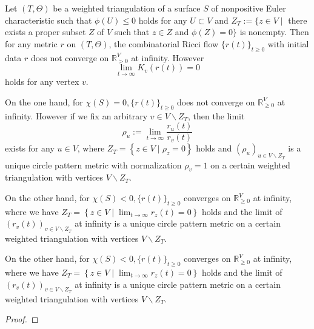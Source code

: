 \begin{theorem}\label{Asuka-Takatsu--theorem}
  Let $ (T, \Theta) $ be a weighted triangulation of a surface $ S $ of nonpositive Euler characteristic such that $ \phi(U) \leq 0 $ holds for any $ U \subset V $ and $ Z_{T}:=\{z \in V \mid $ there exists a proper subset $ Z $ of $ V $ such that $ z \in Z $ and $ \phi(Z)=0\} $ is nonempty. Then for any metric $ r $ on $ (T, \Theta) $, the combinatorial Ricci flow $ \{r(t)\}_{t \geq 0} $ with initial data $ r $ does not converge on $ \mathbb{R}_{>0}^{V} $ at infinity. However
  $$
  \lim _{t \rightarrow \infty} K_{v}(r(t))=0
  $$
  holds for any vertex $ v $.

  On the one hand, for $ \chi(S)=0,\{r(t)\}_{t \geq 0} $ does not converge on $ \mathbb{R}_{\geq 0}^{V} $ at infinity. However if we fix an arbitrary $ v \in V \backslash Z_{T} $, then the limit
  $$
  \rho_{u}:=\lim _{t \rightarrow \infty} \frac{r_{u}(t)}{r_{v}(t)}
  $$
  exists for any $ u \in V $, where $ Z_{T}=\left\{z \in V \mid \rho_{z}=0\right\} $ holds and $ \left(\rho_{u}\right)_{u \in V \backslash Z_{T}} $ is a unique circle pattern metric with normalization $ \rho_{v}=1 $ on a certain weighted triangulation with vertices $ V \backslash Z_{T} $.

  On the other hand, for $ \chi(S)<0,\{r(t)\}_{t \geq 0} $ converges on $ \mathbb{R}_{\geq 0}^{V} $ at infinity, where we have $ Z_{T}=\left\{z \in V \mid \lim _{t \rightarrow \infty} r_{z}(t)=0\right\} $ holds and the limit of $ \left(r_{v}(t)\right)_{v \in V \backslash Z_{T}} $ at infinity is a unique circle pattern metric on a certain weighted triangulation with vertices $ V \backslash Z_{T} $.

  On the other hand, for $ \chi(S)<0,\{r(t)\}_{t \geq 0} $ converges on $ \mathbb{R}_{\geq 0}^{V} $ at infinity, where we have $ Z_{T}=\left\{z \in V \mid \lim _{t \rightarrow \infty} r_{z}(t)=0\right\} $ holds and the limit of $ \left(r_{v}(t)\right)_{v \in V \backslash Z_{T}} $ at infinity is a unique circle pattern metric on a certain weighted triangulation with vertices $ V \backslash Z_{T} $.
\end{theorem}

\begin{proof}
\end{proof}
